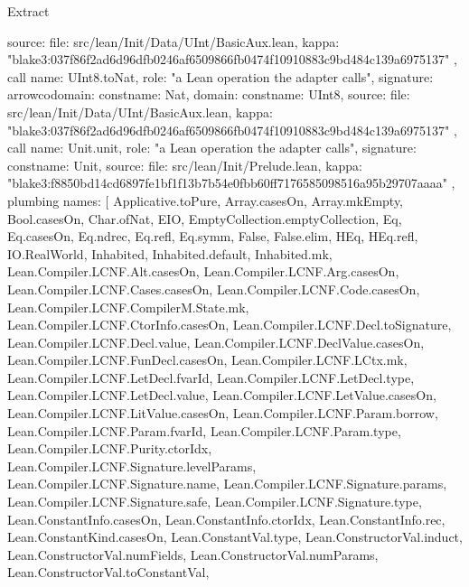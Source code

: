 \begin{lexlean}{Extract}
\begin{toolingmodule}
{{      source: {
        file: src/lean/Init/Data/UInt/BasicAux.lean,
        kappa: "blake3:037f86f2ad6d96dfb0246af6509866fb0474f10910883c9bd484c139a6975137"
      }
    },
    call{
      name: UInt8.toNat,
      role: "a Lean operation the adapter calls",
      signature: arrow{codomain: const{name: Nat}, domain: const{name: UInt8}},
      source: {
        file: src/lean/Init/Data/UInt/BasicAux.lean,
        kappa: "blake3:037f86f2ad6d96dfb0246af6509866fb0474f10910883c9bd484c139a6975137"
      }
    },
    call{
      name: Unit.unit,
      role: "a Lean operation the adapter calls",
      signature: const{name: Unit},
      source: {
        file: src/lean/Init/Prelude.lean,
        kappa: "blake3:f8850bd14cd6897fe1bf1f13b7b54e0fbb60ff7176585098516a95b29707aaaa"
      }
    },
    plumbing{
      names: [
        Applicative.toPure,
        Array.casesOn,
        Array.mkEmpty,
        Bool.casesOn,
        Char.ofNat,
        EIO,
        EmptyCollection.emptyCollection,
        Eq,
        Eq.casesOn,
        Eq.ndrec,
        Eq.refl,
        Eq.symm,
        False,
        False.elim,
        HEq,
        HEq.refl,
        IO.RealWorld,
        Inhabited,
        Inhabited.default,
        Inhabited.mk,
        Lean.Compiler.LCNF.Alt.casesOn,
        Lean.Compiler.LCNF.Arg.casesOn,
        Lean.Compiler.LCNF.Cases.casesOn,
        Lean.Compiler.LCNF.Code.casesOn,
        Lean.Compiler.LCNF.CompilerM.State.mk,
        Lean.Compiler.LCNF.CtorInfo.casesOn,
        Lean.Compiler.LCNF.Decl.toSignature,
        Lean.Compiler.LCNF.Decl.value,
        Lean.Compiler.LCNF.DeclValue.casesOn,
        Lean.Compiler.LCNF.FunDecl.casesOn,
        Lean.Compiler.LCNF.LCtx.mk,
        Lean.Compiler.LCNF.LetDecl.fvarId,
        Lean.Compiler.LCNF.LetDecl.type,
        Lean.Compiler.LCNF.LetDecl.value,
        Lean.Compiler.LCNF.LetValue.casesOn,
        Lean.Compiler.LCNF.LitValue.casesOn,
        Lean.Compiler.LCNF.Param.borrow,
        Lean.Compiler.LCNF.Param.fvarId,
        Lean.Compiler.LCNF.Param.type,
        Lean.Compiler.LCNF.Purity.ctorIdx,
        Lean.Compiler.LCNF.Signature.levelParams,
        Lean.Compiler.LCNF.Signature.name,
        Lean.Compiler.LCNF.Signature.params,
        Lean.Compiler.LCNF.Signature.safe,
        Lean.Compiler.LCNF.Signature.type,
        Lean.ConstantInfo.casesOn,
        Lean.ConstantInfo.ctorIdx,
        Lean.ConstantInfo.rec,
        Lean.ConstantKind.casesOn,
        Lean.ConstantVal.type,
        Lean.ConstructorVal.induct,
        Lean.ConstructorVal.numFields,
        Lean.ConstructorVal.numParams,
        Lean.ConstructorVal.toConstantVal,
}}
\end{toolingmodule}
\end{lexlean}
